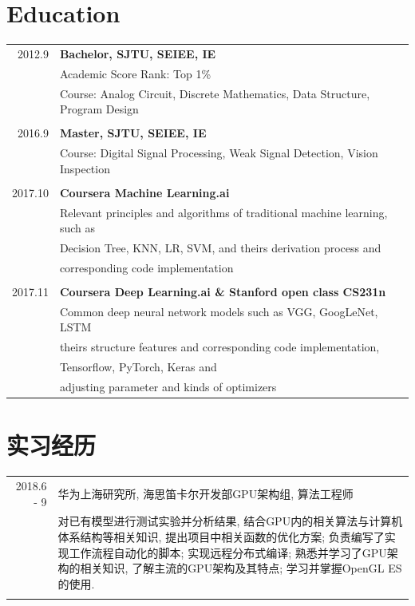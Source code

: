 \documentclass[a4paper,11pt]{article}
\begin{document}
\section{Education}
\begin{tabular}{rl}
\textsc{2012.9} & \bf{Bachelor, SJTU, SEIEE, IE}\\
& Academic Score Rank: Top 1\%\\
& Course: Analog Circuit, Discrete Mathematics, Data Structure, Program Design\\&\\
\textsc{2016.9} & \bf{Master, SJTU, SEIEE, IE}\\
& Course: Digital Signal Processing, Weak Signal Detection, Vision Inspection\\&\\
\textsc{2017.10} & \bf{Coursera Machine Learning.ai}\\
& Relevant principles and algorithms of traditional machine learning, such as\\
& Decision Tree, KNN, LR, SVM, and theirs derivation process and\\
& corresponding code implementation\\&\\
\textsc{2017.11} & \bf{Coursera Deep Learning.ai \& Stanford open class CS231n}\\
& Common deep neural network models such as VGG, GoogLeNet, LSTM\\
& theirs structure features and corresponding code implementation,\\ 
& Tensorflow, PyTorch, Keras and\\
& adjusting parameter and kinds of optimizers
\end{tabular}

\section{实习经历}
\begin{tabular}{r|p{11cm}}
 \textsc{2018.6 - 9} & 华为上海研究所, 海思笛卡尔开发部GPU架构组, 算法工程师 \\&\footnotesize{对已有模型进行测试实验并分析结果, 结合GPU内的相关算法与计算机体系结构等相关知识, 提出项目中相关函数的优化方案; 负责编写了实现工作流程自动化的脚本; 实现远程分布式编译; 熟悉并学习了GPU架构的相关知识, 了解主流的GPU架构及其特点; 学习并掌握OpenGL ES的使用.}\\\multicolumn{2}{c}{} \\
\end{tabular}
\end{document}
